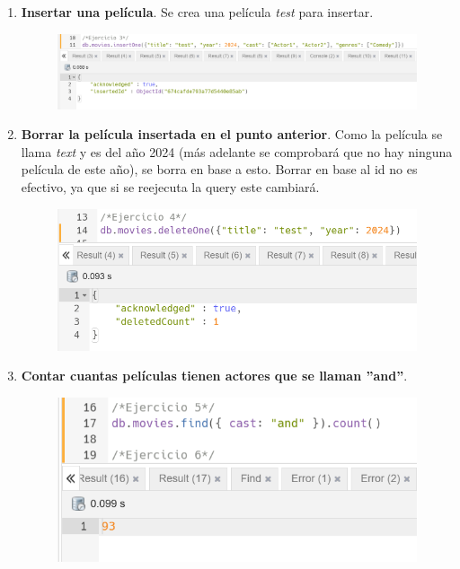 \documentclass[a4paper,onecolumn]{article}
\begin{document}
\begin{sloppypar}
\begin{enumerate}
\begin{center}
\begin{figure}[H]
        \end{figure}
    \end{center}
    \item \textbf{Insertar una película}. Se crea una película \textit{test} para insertar.
    \begin{center}
        \begin{figure}[h!]
            \includegraphics[width=\textwidth]{querys/3.png}
        \end{figure}
    \end{center}
    \item \textbf{Borrar la película insertada en el punto anterior}. Como la película se llama \textit{text} y es del año 2024 (más adelante se comprobará
    que no hay ninguna película de este año), se borra en base a esto. Borrar en base al id no es efectivo, ya que si se reejecuta la query este cambiará.
    \begin{center}
        \begin{figure}[h!]
            \includegraphics[width=\textwidth]{querys/4.png}
        \end{figure}
    \end{center}
    \item \textbf{Contar cuantas películas tienen actores que se llaman ''and''}.
    \begin{center}
        \begin{figure}[H]
            \includegraphics[width=\textwidth]{querys/5.png}

\end{figure}
\end{center}
\end{enumerate}
\end{sloppypar}
\end{document}
